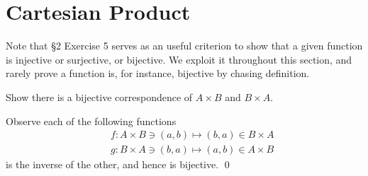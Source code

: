 \documentclass[a4paper,12pt]{article}
\begin{document}
\section{Cartesian Product}
\setcounter{exe}{0}

Note that \S2 Exercise 5 serves as an useful criterion to show that 
a given function is injective or surjective, or bijective.
We exploit it throughout this section,
and rarely prove a function is, for instance, bijective by chasing definition.

\begin{exe}
	Show there is a bijective correspondence of \( A\times B \)
	and \( B \times A \).
\end{exe}\begin{sol}
	Observe each of the following functions
	\begin{eqnarray*}
		&&f:A\times B \ni (a,b)\mapsto (b,a)\in B \times A\\
		&&g:B\times A \ni (b,a)\mapsto (a,b)\in A \times B
	\end{eqnarray*}
	is the inverse of the other, and hence is bijective.
	\qed\end{sol}
\end{document}
